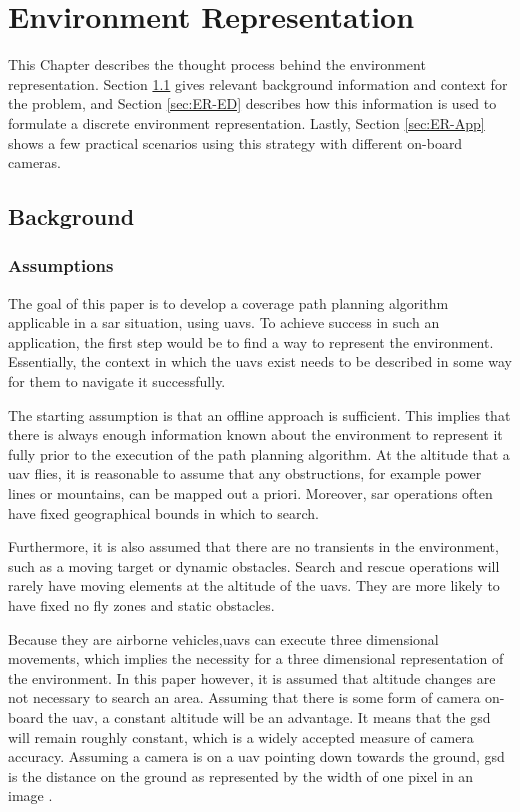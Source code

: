 \chapter{Environment Representation}
\label{chp:ER}
\acresetall
This Chapter describes the thought process behind the environment representation. Section \ref{sec:ER-bg} gives relevant background information and context for the problem, and Section \ref{sec:ER-ED} describes how this information is used to formulate a discrete environment representation. Lastly, Section \ref{sec:ER-App} shows a few practical scenarios using this strategy with different on-board cameras. 

\section{Background}
\label{sec:ER-bg}
\subsection{Assumptions}
The goal of this paper is to develop a coverage path planning algorithm \hbox{applicable} in a \ac{sar} situation, using \acp{uav}. To achieve success in such an application, the first step would be to find a way to represent the environment. Essentially, the context in which the \acp{uav} exist needs to be described in some way for them to navigate it successfully.
 
The starting assumption is that an offline approach is sufficient. This implies that there is always enough information known about the environment to represent it fully prior to the execution of the path planning algorithm. At the altitude that a \ac{uav} flies, it is reasonable to assume that any obstructions, for example power lines or mountains, can be mapped out a priori. Moreover, \ac{sar} operations often have fixed geographical bounds in which to search.

Furthermore, it is also assumed that there are no transients in the environment, such as a moving target or dynamic obstacles. Search and rescue operations will rarely have moving elements at the altitude of the \acp{uav}. They are more likely to have fixed no fly zones and static obstacles.

Because they are airborne vehicles,\acp{uav} can execute three dimensional movements, which implies the necessity for a three dimensional representation of the environment. In this paper however, it is assumed that altitude changes are not necessary to search an area. Assuming that there is some form of camera on-board the \ac{uav}, a constant altitude will be an advantage. It means that the \ac{gsd} will remain roughly constant, which is a widely accepted measure of camera accuracy. Assuming a camera is on a \ac{uav} pointing down towards the ground, \ac{gsd} is the distance on the ground as represented by the width of one pixel in an image \cite{PropellerAero2021}.

